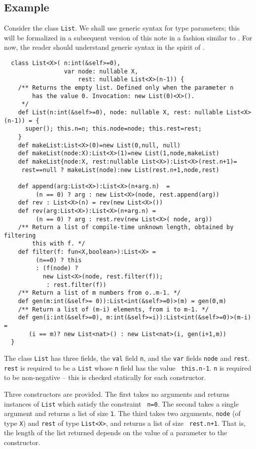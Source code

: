\documentclass{article}
\begin{document}
\subsection{Example}
\begin{example}[List]\label{List}
Consider the class {\tt List}. We shall use generic syntax for
type parameters; this will be formalized in a subsequent version 
of this note in a fashion similar to \cite{FJ}. For now, 
the reader should understand generic syntax in the spirit of \cite{FJ}.

{\footnotesize
\begin{verbatim}
  class List<X>( n:int(&self>=0), 
                 var node: nullable X, 
                     rest: nullable List<X>(n-1)) {
    /** Returns the empty list. Defined only when the parameter n 
        has the value 0. Invocation: new List(0)<X>().
     */
    def List(n:int(&self>=0), node: nullable X, rest: nullable List<X>(n-1)) = {
      super(); this.n=n; this.node=node; this.rest=rest;
    }
    def makeList:List<X>(0)=new List(0,null, null)
    def makeList(node:X):List<X>(1)=new List(1,node,makeList)
    def makeList{node:X, rest:nullable List<X>):List<X>(rest.n+1)=
     rest==null ? makeList(node):new List(rest.n+1,node,rest)

    def append(arg:List<X>):List<X>(n+arg.n)  =
         (n == 0) ? arg : new List<X>(node, rest.append(arg))
    def rev : List<X>(n) = rev(new List<X>())
    def rev(arg:List<X>):List<X>(n+arg.n) = 
         (n == 0) ? arg : rest.rev(new List<X>( node, arg))
    /** Return a list of compile-time unknown length, obtained by filtering
        this with f. */
    def filter(f: fun<X,boolean>):List<X> = 
         (n==0) ? this
         : (f(node) ? 
           new List<X>(node, rest.filter(f));
            : rest.filter(f))
    /** Return a list of m numbers from o..m-1. */
    def gen(m:int(&self>= 0)):List<int(&self>=0)>(m) = gen(0,m)
    /** Return a list of (m-i) elements, from i to m-1. */
    def gen(i:int(&self>=0), m:int(&self>=i)):List<int(&self>=0)>(m-i) = 
       (i == m)? new List<nat>() : new List<nat>(i, gen(i+1,m))
  }  
\end{verbatim}}

The class {\tt List} has three fields, the {\tt val} field {\tt n},
and the {\tt var} fields {\tt node} and {\tt rest}. {\tt rest} is
required to be a {\tt List} whose {\tt n} field has the value {\tt
this.n-1}.  {\tt n} is required to be non-negative -- this is checked
statically for each constructor.

Three constructors are provided. The first takes no arguments and
returns instances of {\tt List} which satisfy the constraint {\tt
n=0}. The second takes a single argument and returns a list of size
{\tt 1}. The third takes two arguments, {\tt node} (of type {\tt X})
and {\tt rest} of type {\tt List<X>}, and returns a list of size {\tt
rest.n+1}. That is, the length of the list returned depends on the
value of a parameter to the constructor. 


\end{example}
\end{document}
